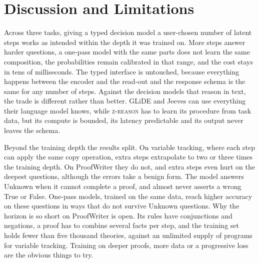 \documentclass{article}
\newcommand{\zr}{\textsc{z-reason}}
\begin{document}
\section{Discussion and Limitations}
\label{sec:discussion}

Across three tasks, giving a typed decision model a user-chosen number of latent steps works as intended within the depth it was trained on. More steps answer harder questions, a one-pass model with the same parts does not learn the same composition, the probabilities remain calibrated in that range, and the cost stays in tens of milliseconds. The typed interface is untouched, because everything happens between the encoder and the read-out and the response schema is the same for any number of steps. Against the decision models that reason in text, the trade is different rather than better. GLiDE and Jeeves can use everything their language model knows, while \zr{} has to learn its procedure from task data, but its compute is bounded, its latency predictable and its output never leaves the schema.

Beyond the training depth the results split. On variable tracking, where each step can apply the same copy operation, extra steps extrapolate to two or three times the training depth. On ProofWriter they do not, and extra steps even hurt on the deepest questions, although the errors take a benign form. The model answers Unknown when it cannot complete a proof, and almost never asserts a wrong True or False. One-pass models, trained on the same data, reach higher accuracy on these questions in ways that do not survive Unknown questions. Why the horizon is so short on ProofWriter is open. Its rules have conjunctions and negations, a proof has to combine several facts per step, and the training set holds fewer than five thousand theories, against an unlimited supply of programs for variable tracking. Training on deeper proofs, more data or a progressive loss \cite{bansal2022endtoend} are the obvious things to try.
\end{document}
